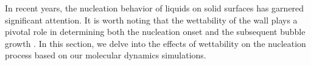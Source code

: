 In recent years, the nucleation behavior of liquids on solid surfaces has garnered significant attention. It is worth noting that the wettability of the wall plays a pivotal role in determining both the nucleation onset and the subsequent bubble growth \cite{kim2015,chen2019}. In this section, we delve into the effects of wettability on the nucleation process based on our molecular dynamics simulations.
